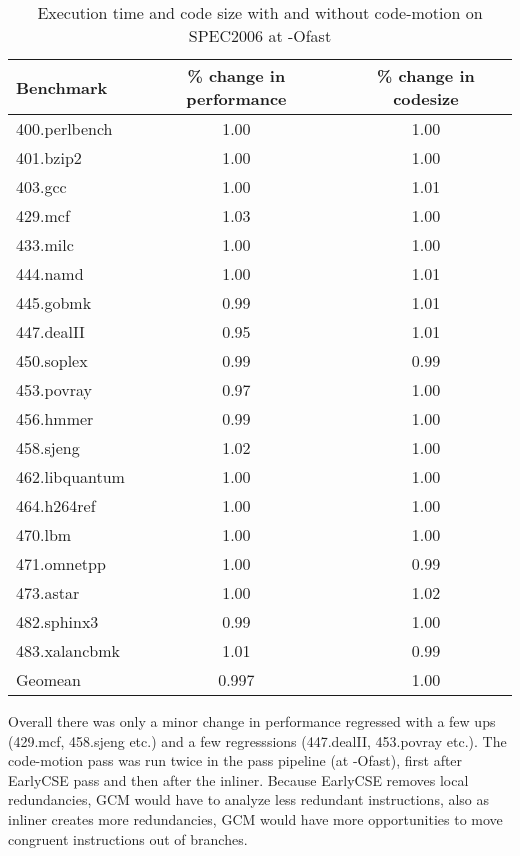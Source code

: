 \documentclass[acmlarge,review,anonymous]{acmart}\settopmatter{printfolios=true}
\begin{document}
\begin{table}[h!]
  \begin{center}
    \begin{tabular}{|l|c|c|}
      \hline
Benchmark       &\% change in performance & \% change in codesize \\\hline
400.perlbench	& 1.00  & 1.00 \\\hline
401.bzip2	& 1.00  & 1.00 \\\hline
403.gcc	        & 1.00  & 1.01 \\\hline
429.mcf	        & 1.03  & 1.00 \\\hline
433.milc	& 1.00  & 1.00 \\\hline
444.namd	& 1.00  & 1.01 \\\hline
445.gobmk	& 0.99  & 1.01 \\\hline
447.dealII	& 0.95  & 1.01 \\\hline
450.soplex	& 0.99  & 0.99 \\\hline
453.povray	& 0.97  & 1.00 \\\hline
456.hmmer	& 0.99  & 1.00 \\\hline
458.sjeng	& 1.02  & 1.00 \\\hline
462.libquantum	& 1.00  & 1.00 \\\hline
464.h264ref	& 1.00  & 1.00 \\\hline
470.lbm	        & 1.00  & 1.00 \\\hline
471.omnetpp	& 1.00  & 0.99 \\\hline
473.astar	& 1.00  & 1.02 \\\hline
482.sphinx3	& 0.99  & 1.00 \\\hline
483.xalancbmk	& 1.01  & 0.99 \\\hline
Geomean         & 0.997 & 1.00 \\\hline
    \end{tabular}
  \end{center}
  \caption{Execution time and code size with and without code-motion on SPEC2006 at -Ofast}
  \label{tab:code-size}
\end{table}

Overall there was only a minor change in performance regressed with a few ups
(429.mcf, 458.sjeng etc.) and a few regresssions (447.dealII, 453.povray
etc.). The code-motion pass was run twice in the pass pipeline (at -Ofast),
first after EarlyCSE pass and then after the inliner. Because EarlyCSE removes
local redundancies, GCM would have to analyze less redundant instructions, also
as inliner creates more redundancies, GCM would have more opportunities to move
congruent instructions out of branches.
\end{document}
